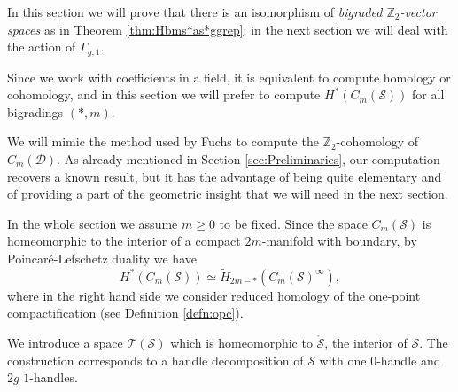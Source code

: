 \documentclass{amsart}
\theoremstyle{plain}
\theoremstyle{definition}
\newcommand{\D}{\mathcal{D}}
\renewcommand{\S}{\mathcal{S}}
\newcommand{\T}{\mathcal{T}}
\newcommand{\Z}{\mathbb{Z}}
\renewcommand{\gg}{\Gamma_{g,1}}
\newcommand{\cms}{C_m(\S)}
\newcommand{\mrS}{\mathring{\S}}
\begin{document}
In this section we will prove that there is an isomorphism of \emph{bigraded $\Z_2$-vector spaces}
as in Theorem \ref{thm:Hbms*as*ggrep}; in the next section we will deal with the action of
$\gg$.

Since we work with coefficients in a field, it is equivalent to compute homology or cohomology,
and in this section we will prefer to compute $H^*(\cms)$ for all bigradings $(*,m)$.

We will mimic the method used by Fuchs \cite{Fuchs:CohomBraidModtwo} to compute the $\Z_2$-cohomology
of $C_m(\D)$.
As already mentioned in Section \ref{sec:Preliminaries}, our computation recovers a known result, but it has the advantage of
being quite elementary and of providing a part of
the geometric insight that we will need in the next section.

In the whole section we assume $m\geq 0$ to be fixed.
Since the space $\cms$ is homeomorphic to the interior of a compact
$2m$-manifold with boundary, by Poincaré-Lefschetz
duality we have
\[
 H^*(\cms)\simeq \tilde H_{2m-*}(\cms^{\infty}),
\]
where in the right hand side we consider reduced homology of the one-point compactification (see Definition \ref{defn:opc}).

We introduce a space $\T(\S)$ which is homeomorphic to $\mrS$, the interior of $\S$. The construction
corresponds to a handle decomposition of $\S$ with one $0$-handle and $2g$ $1$-handles.
\end{document}
